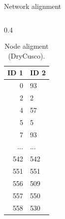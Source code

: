 \documentclass[aspectratio=169]{beamer}
\begin{document}
    \begin{frame}{Network alignment}
        \begin{columns}[t] %
            \begin{column}{0.4\textwidth}
                \begin{table}[htp!]
                    \scriptsize
                    \centering
                    \caption{Node aligment (DryCusco).}
                    \begin{tabular}{rl}\toprule
                        ID 1 & ID 2 \\\midrule                        
                        0 & 93 \\
                        \rowcolor{yellow}
                        2 & 2 \\
                        4 & 57 \\
                        \rowcolor{yellow}
                        5 & 5 \\
                        7 & 93 \\
                        ... & ... \\
                        \rowcolor{yellow}
                        542 & 542 \\
                        \rowcolor{yellow}
                        551 & 551 \\
                        556 & 509 \\
                        557 & 550 \\
                        558 & 530 \\\bottomrule
                    \end{tabular}
                \end{table}
            \end{column}
            

\end{columns}
\end{frame}
\end{document}
